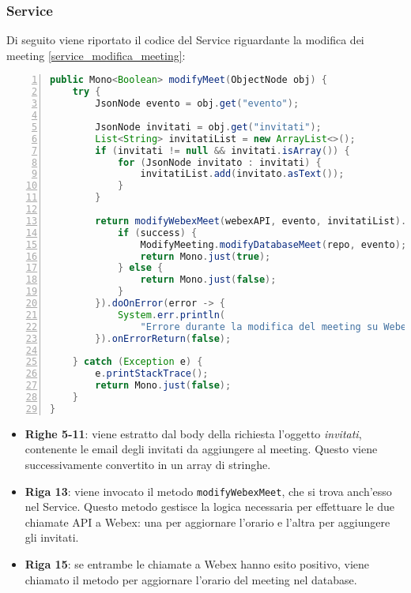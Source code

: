 \subsubsection{Service}
Di seguito viene riportato il codice del Service riguardante la modifica dei meeting \ref{service_modifica_meeting}: 
\begin{lstlisting}[language=java, frame=lines, basicstyle=\ttfamily\scriptsize, numbers=left, 
    caption={service modifica meeting}, label={service_modifica_meeting}]
public Mono<Boolean> modifyMeet(ObjectNode obj) {
    try {
        JsonNode evento = obj.get("evento");
        
        JsonNode invitati = obj.get("invitati");    
        List<String> invitatiList = new ArrayList<>();
        if (invitati != null && invitati.isArray()) {
            for (JsonNode invitato : invitati) {
                invitatiList.add(invitato.asText());
            }
        }

        return modifyWebexMeet(webexAPI, evento, invitatiList).flatMap(success -> {
            if (success) {
                ModifyMeeting.modifyDatabaseMeet(repo, evento);
                return Mono.just(true);
            } else {
                return Mono.just(false);
            }
        }).doOnError(error -> {
            System.err.println(
                "Errore durante la modifica del meeting su Webex: " + error.getMessage());
        }).onErrorReturn(false);

    } catch (Exception e) {
        e.printStackTrace();
        return Mono.just(false);
    }
}
\end{lstlisting}
\begin{itemize}
    \item \textbf{Righe 5-11}: viene estratto dal body della richiesta l'oggetto \textit{invitati}, 
    contenente le email degli invitati da aggiungere al meeting. Questo viene successivamente convertito in un array di stringhe.
    
    \item \textbf{Riga 13}:  viene invocato il metodo \texttt{modifyWebexMeet}, che si trova anch'esso nel Service. 
    Questo metodo gestisce la logica necessaria per effettuare le due chiamate API a Webex: una per aggiornare 
    l'orario e l'altra per aggiungere gli invitati.

    \item \textbf{Riga 15}: se entrambe le chiamate a Webex hanno esito positivo, 
    viene chiamato il metodo per aggiornare l'orario del meeting nel database.
\end{itemize}